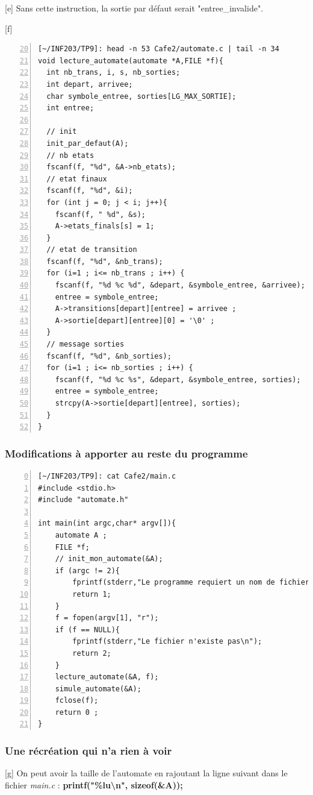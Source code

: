 \documentclass[12pt,a4paper,notitlepage,colorinlistoftodos]{article}
\begin{document}
[e]
Sans cette instruction, la sortie par défaut serait "entree\_invalide".


[f]
\begin{lstlisting}[numbers=left, firstnumber = 20 ]
[~/INF203/TP9]: head -n 53 Cafe2/automate.c | tail -n 34
void lecture_automate(automate *A,FILE *f){
  int nb_trans, i, s, nb_sorties;
  int depart, arrivee;
  char symbole_entree, sorties[LG_MAX_SORTIE];
  int entree;

  // init
  init_par_defaut(A); 
  // nb etats
  fscanf(f, "%d", &A->nb_etats);
  // etat finaux
  fscanf(f, "%d", &i); 
  for (int j = 0; j < i; j++){
    fscanf(f, " %d", &s);
    A->etats_finals[s] = 1;
  }
  // etat de transition
  fscanf(f, "%d", &nb_trans);
  for (i=1 ; i<= nb_trans ; i++) {
    fscanf(f, "%d %c %d", &depart, &symbole_entree, &arrivee);
    entree = symbole_entree;
    A->transitions[depart][entree] = arrivee ;
    A->sortie[depart][entree][0] = '\0' ;
  }
  // message sorties
  fscanf(f, "%d", &nb_sorties);
  for (i=1 ; i<= nb_sorties ; i++) {
    fscanf(f, "%d %c %s", &depart, &symbole_entree, sorties);
    entree = symbole_entree;
    strcpy(A->sortie[depart][entree], sorties);
  }
}
\end{lstlisting}

\subsubsection{Modifications à apporter au reste du programme}

\begin{lstlisting}[numbers=left, firstnumber = 0 ]
[~/INF203/TP9]: cat Cafe2/main.c
#include <stdio.h>
#include "automate.h"

int main(int argc,char* argv[]){
	automate A ;
	FILE *f;
	// init_mon_automate(&A);
	if (argc != 2){
		fprintf(stderr,"Le programme requiert un nom de fichier\n");
		return 1;
	}
	f = fopen(argv[1], "r");
	if (f == NULL){
		fprintf(stderr,"Le fichier n'existe pas\n");
		return 2;
	}
	lecture_automate(&A, f);
	simule_automate(&A);
	fclose(f);
	return 0 ;
}
\end{lstlisting}

\subsubsection{Une récréation qui n’a rien à voir}

[g]
On peut avoir la taille de l'automate en rajoutant la ligne suivant dans le fichier \textit{main.c} :
\textbf{printf("\%lu\textbackslash n", sizeof(\&A));}
\end{document}
